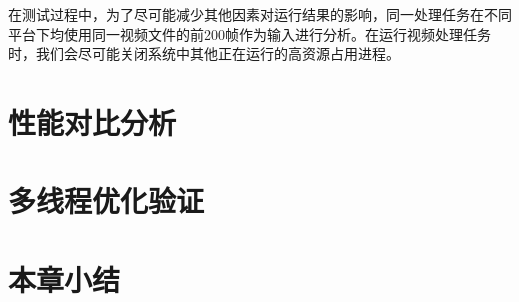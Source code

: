 在测试过程中，为了尽可能减少其他因素对运行结果的影响，同一处理任务在不同平台下均使用同一视频文件的前200帧作为输入进行分析。在运行视频处理任务时，我们会尽可能关闭系统中其他正在运行的高资源占用进程。


\section{性能对比分析}

\section{多线程优化验证}

\section{本章小结}

